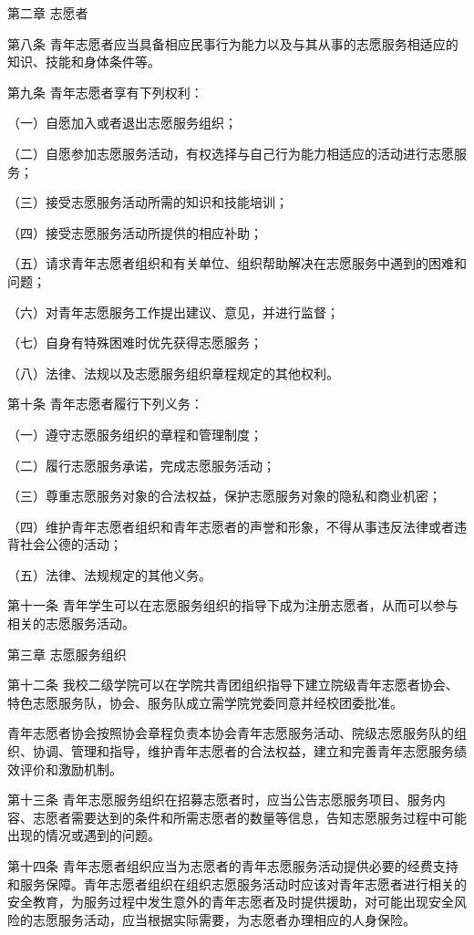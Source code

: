 \documentclass[UTF8,12pt,a4paper]{report}
\begin{document}
 

第二章  志愿者

第八条 青年志愿者应当具备相应民事行为能力以及与其从事的志愿服务相适应的知识、技能和身体条件等。

第九条 青年志愿者享有下列权利：

（一）自愿加入或者退出志愿服务组织；

（二）自愿参加志愿服务活动，有权选择与自己行为能力相适应的活动进行志愿服务；

（三）接受志愿服务活动所需的知识和技能培训；

（四）接受志愿服务活动所提供的相应补助；

（五）请求青年志愿者组织和有关单位、组织帮助解决在志愿服务中遇到的困难和问题；

（六）对青年志愿服务工作提出建议、意见，并进行监督；

（七）自身有特殊困难时优先获得志愿服务；

（八）法律、法规以及志愿服务组织章程规定的其他权利。

第十条 青年志愿者履行下列义务：

（一）遵守志愿服务组织的章程和管理制度；

（二）履行志愿服务承诺，完成志愿服务活动；

（三）尊重志愿服务对象的合法权益，保护志愿服务对象的隐私和商业机密；

（四）维护青年志愿者组织和青年志愿者的声誉和形象，不得从事违反法律或者违背社会公德的活动；

（五）法律、法规规定的其他义务。

第十一条 青年学生可以在志愿服务组织的指导下成为注册志愿者，从而可以参与相关的志愿服务活动。

 

第三章  志愿服务组织

第十二条 我校二级学院可以在学院共青团组织指导下建立院级青年志愿者协会、特色志愿服务队，协会、服务队成立需学院党委同意并经校团委批准。

青年志愿者协会按照协会章程负责本协会青年志愿服务活动、院级志愿服务队的组织、协调、管理和指导，维护青年志愿者的合法权益，建立和完善青年志愿服务绩效评价和激励机制。

第十三条 青年志愿服务组织在招募志愿者时，应当公告志愿服务项目、服务内容、志愿者需要达到的条件和所需志愿者的数量等信息，告知志愿服务过程中可能出现的情况或遇到的问题。

第十四条 青年志愿者组织应当为志愿者的青年志愿服务活动提供必要的经费支持和服务保障。青年志愿者组织在组织志愿服务活动时应该对青年志愿者进行相关的安全教育，为服务过程中发生意外的青年志愿者及时提供援助，对可能出现安全风险的志愿服务活动，应当根据实际需要，为志愿者办理相应的人身保险。
\end{document}
